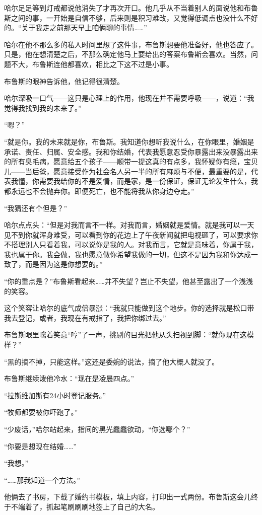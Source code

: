 \documentclass[../main]{subfiles}
\begin{document}
哈尔足足等到灯戒都说他消失了才再次开口。他几乎从不当着别人的面说他和布鲁斯之间的事，一开始是自信不够，后来则是积习难改，又觉得低调点也没什么不好的。“关于我走之前那天早上咱俩聊的事情\ldots\ldots”

哈尔在他不那么多的私人时间里想了这件事，布鲁斯想要他准备好，他也答应了。只是，他在想清楚之后，不那么确定他马上要给出的答案布鲁斯会喜欢。当然，问题不大，布鲁斯连他都喜欢，相比之下这不过是小事。

布鲁斯的眼神告诉他，他记得很清楚。

哈尔深吸一口气——这只是心理上的作用，他现在并不需要呼吸——，说道：“我觉得我找到我的未来了。”

“嗯？”

“就是你。我的未来就是你，布鲁斯。我知道你想听我说什么，在你眼里，婚姻是承诺、责任、归属、安全感。我和你结婚，代表我愿意忍受你暴露出来没暴露出来的所有臭毛病，愿意给五个孩子——顺带一提这真的有点多，我怀疑你有瘾，宝贝儿——当后爸，愿意接受作为社会名人另一半的所有麻烦与不便，最重要的是，代表我懂，你需要我给你的不是爱情，而是家，是一份保证，保证无论发生什么，我都永远也不会抛弃你。即便死亡，也不能将我从你身边夺走。”

“我猜还有个但是？”

哈尔点点头：“但是对我而言不一样。对我而言，婚姻就是爱情。就是我可以一天见不到你就浑身难受，可以看到你的花边上了午夜新闻就把电视砸了，可以要求你不搭理别人只看着我，可以说你是我的人。对我而言，它就是意味着，你属于我，我也属于你。我会做，我也愿意做你希望我做的一切，但这不是因为我和你达成一致了，而是因为这是你想要的。”

“你的重点是？”布鲁斯看起来……并不失望？岂止不失望，他甚至露出了一个浅浅的笑容。

这个笑容让哈尔的底气成倍暴涨：“我就只能做到这个地步。你的选择就是松口带我去登记，或者，我现在有戒指了，我把你绑过去。”

布鲁斯眼里噙着笑意“哼”了一声，挑剔的目光把他从头扫视到脚：“就你现在这模样？”

“黑的摘不掉，只能这样。”这还是委婉的说法，摘了他大概人就没了。

布鲁斯继续泼他冷水：“现在是凌晨四点。”

“拉斯维加斯有24小时登记服务。”

“牧师都要被你吓跑了。”

“少废话，”哈尔站起来，指间的黑光蠢蠢欲动，“你选哪个？”

“你要是想现在结婚\ldots\ldots”

“我想。”

“……那我知道一个方法。”

他俩去了书房，下载了婚约书模板，填上内容，打印出一式两份。布鲁斯这会儿终于不端着了，抓起笔刷刷刷地签上了自己的大名。
\end{document}

